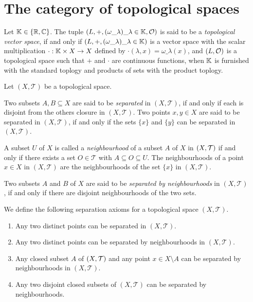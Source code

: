 \section{The category of topological spaces}


\begin{definition}
	Let $\mathbb K \in {\left \{ \mathbb R, \mathbb C\right \}}$. The tuple $\tvspace{\K}$ is said to be a \textit{topological vector space}, if and only if ${\left ( L, +, {\left ( \omega\_\lambda \right )}\_{\lambda \in \mathbb K} \right )}$ is a vector space with the scalar multiplication $\cdot: \mathbb K \times X \to X$ defined by $\cdot(\lambda, x) = \omega\_\lambda(x)$, and $\tspace[L][O]$ is a topological space such that $+$ and $\cdot$ are continuous functions, when $\mathbb K$ is furnished with the standard toplogy and products of sets with the product toplogy.
\end{definition}

\begin{definition}
	Let $(X, \mathcal{T})$ be a topological space. 
	
	Two subsets $A,B \subseteq X$ are said to be \textit{separated} in $(X, \mathcal{T})$, if and only if each is disjoint from the others closure in $(X, \mathcal{T})$. Two points $x,y \in X$ are said to be separated in $(X, \mathcal{T})$, if and only if the sets $\{x\}$ and $\{y\}$ can be separated in $(X, \mathcal{T})$.
	
	A subset $U$ of $X$ is called a \textit{neighbourhood} of a subset $A$ of $X$ in $\tspace$ if and only if there exists a set $O \in \mathcal{T}$ with $A \subseteq O \subseteq U$. The neighbourhoods of a point $x \in X$ in $(X, \mathcal{T})$ are the neighbourhoods of the set $\{x\}$ in $(X, \mathcal{T})$.
	
	Two subsets $A$ and $B$ of $X$ are said to be \textit{separated by neighbourhoods} in $(X, \mathcal{T})$, if and only if there are disjoint neighbourhoods of the two sets. 
\end{definition}

\begin{definition}
	We define the following separation axioms for a topological space $(X, \mathcal{T})$.
	\begin{enumerate}[label= $(T\_\arabic*)$]
		\item \label{axiom:t1} Any two distinct points can be separated in $(X, \mathcal{T})$. 
		
		\item \label{axiom:t2} Any two distinct points can be separated by neighbourhoods in $(X, \mathcal{T})$. 
		
		\item \label{axiom:t3} Any closed subset $A$ of $\tspace$ and any point $x \in X\setminus A$ can be separated by neighbourhoods in $(X, \mathcal{T})$. 
		
		\item \label{axiom:t4} Any two disjoint closed subsets of $(X, \mathcal{T})$ can be separated by neighbourhoods. 
	\end{enumerate}
\end{definition}

